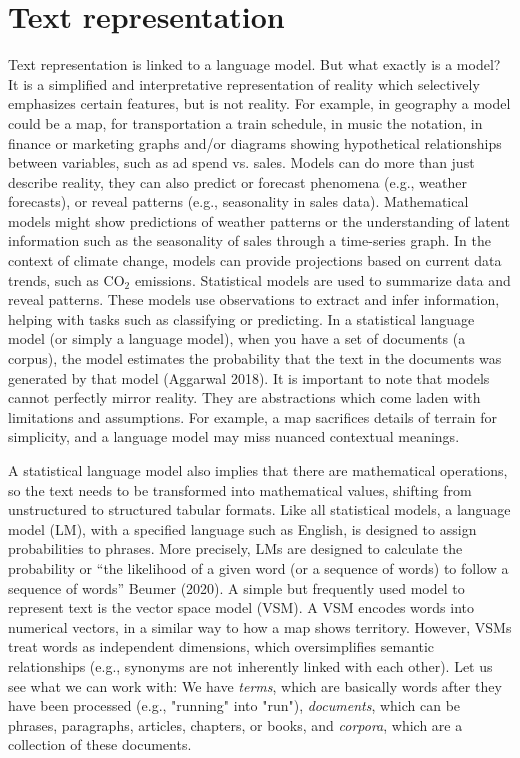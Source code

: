 \section{Text representation}\label{text-representation}

Text representation is linked to a language model. But what exactly is a
model? It is a simplified and interpretative representation of reality which selectively emphasizes certain features,
but is not reality. For example, in geography a model could be
a map, for transportation a train schedule, in music the notation, in finance or marketing graphs and/or diagrams
showing hypothetical relationships between variables, such as ad spend vs. sales. Models can do more than just describe reality,
they can also predict or forecast phenomena (e.g., weather forecasts), or reveal patterns (e.g., seasonality in sales data). Mathematical models might show
predictions of weather patterns or the understanding of latent information such as the
seasonality of sales through a time-series graph. In the context of climate
change, models can provide projections based on current data trends,
such as \(\text{CO}_2\) emissions. Statistical models are used to
summarize data and reveal patterns. These models use observations to
extract and infer information, helping with tasks such as classifying or
predicting. In a statistical language model (or simply a language
model), when you have a set of documents (a corpus), the model estimates
the probability that the text in the documents was generated by that
model (Aggarwal 2018). It is important to note that models cannot perfectly
mirror reality. They are abstractions which come laden with limitations and
assumptions. For example, a map sacrifices details of terrain for simplicity, and a language model may miss nuanced contextual meanings.


A statistical language model also implies that there are mathematical operations,
so the text needs to be transformed into mathematical values, shifting
from unstructured to structured tabular formats. Like all statistical models, a language model (LM),
with a specified language such as English, is designed to assign
probabilities to phrases. More precisely, LMs are designed to
calculate the probability or ``the likelihood of a given word (or a
sequence of words) to follow a sequence of words'' Beumer (2020). A simple but
frequently used model to represent text is the vector
space model (VSM). A VSM
encodes words into numerical vectors, in a similar way to how a map shows territory. However, VSMs treat words as independent dimensions, which oversimplifies semantic relationships (e.g., synonyms are not inherently linked with each other). Let us see what we can work with: We have
\emph{terms}, which are basically words after they have been processed (e.g., "running" into "run"),
\emph{documents}, which can be phrases, paragraphs, articles, chapters, or
books, and \emph{corpora}, which are a collection of these documents.

